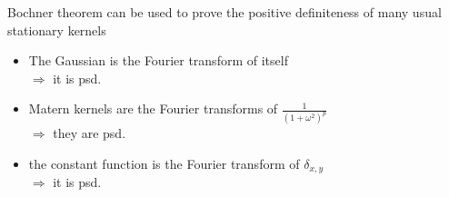 \documentclass{beamer}
\begin{document}
\begin{frame}{}
Bochner theorem can be used to prove the positive definiteness of many usual stationary kernels \vspace{2mm}
\begin{itemize}
  \item The Gaussian is the Fourier transform of itself \\
  \qquad $\Rightarrow$ it is psd.
  \item Matern kernels are the Fourier transforms of $\frac{1}{(1+\omega^2)^p}$ \\
  \qquad $\Rightarrow$ they are psd.
  \item the constant function is the Fourier transform of $\delta_{x,y}$ \\
  \qquad $\Rightarrow$ it is psd.
\end{itemize} \vspace{5mm}
\end{frame}
\end{document}
